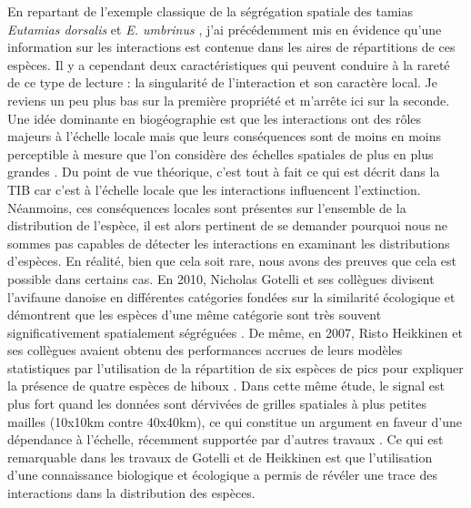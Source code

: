 En repartant de l'exemple classique de la ségrégation spatiale des
tamias \emph{Eutamias dorsalis} et \emph{E. umbrinus} \citep{Brown1971},
j'ai précédemment mis en évidence qu'une information sur les
interactions est contenue dans les aires de répartitions de ces espèces.
Il y a cependant deux caractéristiques qui peuvent conduire à la rareté
de ce type de lecture : la singularité de l'interaction et son caractère
local. Je reviens un peu plus bas sur la première propriété et m'arrête
ici sur la seconde. Une idée dominante en biogéographie est que les
interactions ont des rôles majeurs à l'échelle locale mais que leurs
conséquences sont de moins en moins perceptible à mesure que l'on
considère des échelles spatiales de plus en plus grandes \citep[voir
l'unique figure de][]{McGill2010}. Du point de vue théorique, c'est tout
à fait ce qui est décrit dans la TIB car c'est à l'échelle locale que
les interactions influencent l'extinction. Néanmoins, ces conséquences
locales sont présentes sur l'ensemble de la distribution de l'espèce, il
est alors pertinent de se demander pourquoi nous ne sommes pas capables
de détecter les interactions en examinant les distributions d'espèces.
En réalité, bien que cela soit rare, nous avons des preuves que cela est
possible dans certains cas. En 2010, Nicholas Gotelli et ses collègues
divisent l'avifaune danoise en différentes catégories fondées sur la
similarité écologique et démontrent que les espèces d'une même catégorie
sont très souvent significativement spatialement ségréguées
\citep{Gotelli2010}. De même, en 2007, Risto Heikkinen et ses collègues
avaient obtenu des performances accrues de leurs modèles statistiques
par l'utilisation de la répartition de six espèces de pics pour
expliquer la présence de quatre espèces de hiboux \citep{Heikkinen2007}.
Dans cette même étude, le signal est plus fort quand les données sont
dérvivées de grilles spatiales à plus petites mailles (10x10km contre
40x40km), ce qui constitue un argument en faveur d'une dépendance à
l'échelle, récemment supportée par d'autres travaux
\citep{Belmaker2015}. Ce qui est remarquable dans les travaux de Gotelli
et de Heikkinen est que l'utilisation d'une connaissance biologique et
écologique a permis de révéler une trace des interactions dans la
distribution des espèces.


